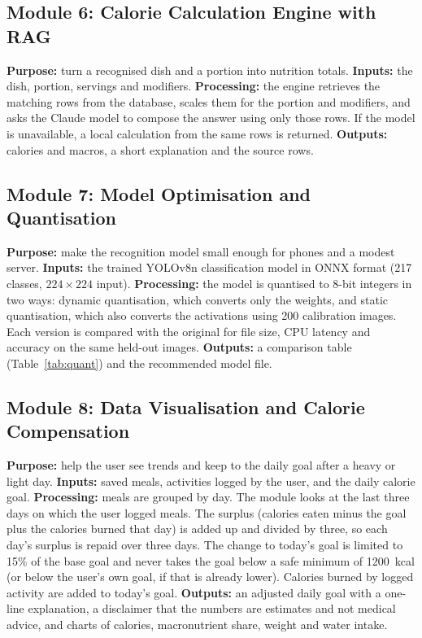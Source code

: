 \subsection{Module 6: Calorie Calculation Engine with RAG}
\textbf{Purpose:} turn a recognised dish and a portion into nutrition totals. \textbf{Inputs:} the dish,
portion, servings and modifiers. \textbf{Processing:} the engine retrieves the matching rows from the
database, scales them for the portion and modifiers, and asks the Claude model to compose the answer
using only those rows. If the model is unavailable, a local calculation from the same rows is returned.
\textbf{Outputs:} calories and macros, a short explanation and the source rows.

\subsection{Module 7: Model Optimisation and Quantisation}
\textbf{Purpose:} make the recognition model small enough for phones and a modest server.
\textbf{Inputs:} the trained YOLOv8n classification model in ONNX format (217 classes,
$224\times224$ input). \textbf{Processing:} the model is quantised to 8-bit integers in two ways:
dynamic quantisation, which converts only the weights, and static quantisation, which also converts
the activations using 200 calibration images. Each version is compared with the original for file size,
CPU latency and accuracy on the same held-out images. \textbf{Outputs:} a comparison table
(Table~\ref{tab:quant}) and the recommended model file.

\subsection{Module 8: Data Visualisation and Calorie Compensation}
\textbf{Purpose:} help the user see trends and keep to the daily goal after a heavy or light day.
\textbf{Inputs:} saved meals, activities logged by the user, and the daily calorie goal.
\textbf{Processing:} meals are grouped by day. The module looks at the last three days on which the user
logged meals. The surplus (calories eaten minus the goal plus the calories burned that day) is added up
and divided by three, so each day's surplus is repaid over three days. The change to today's goal is
limited to 15\% of the base goal and never takes the goal below a safe minimum of 1200~kcal (or below the
user's own goal, if that is already lower). Calories burned by logged activity are added to today's goal.
\textbf{Outputs:} an adjusted daily goal with a one-line explanation, a disclaimer that the numbers are
estimates and not medical advice, and charts of calories, macronutrient share, weight and water intake.

